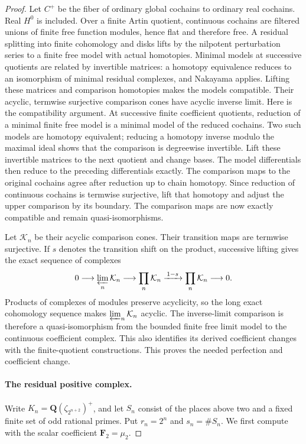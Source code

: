 \documentclass[11pt]{article}
\theoremstyle{definition}
\theoremstyle{remark}
\begin{document}
\begin{proof}\leavevmode
Let $C^+$ be the fiber of ordinary global cochains to ordinary real
cochains. Real $H^0$ is included. Over a finite Artin quotient,
continuous cochains are filtered unions of finite free function
modules, hence flat and therefore free. A residual splitting into
finite cohomology and disks lifts by the nilpotent perturbation
series to a finite free model with actual homotopies. Minimal models
at successive quotients are related by invertible matrices:
a homotopy equivalence reduces to an isomorphism of minimal residual
complexes, and Nakayama applies. Lifting these matrices and comparison
homotopies makes the models compatible. Their acyclic, termwise
surjective comparison cones have acyclic inverse limit.
Here is the compatibility argument. At successive finite coefficient
quotients, reduction of a minimal finite free model is a minimal model
of the reduced cochains. Two such models are homotopy equivalent;
reducing a homotopy inverse modulo the maximal ideal shows that the
comparison is degreewise invertible. Lift these invertible matrices
to the next quotient and change bases. The model differentials then
reduce to the preceding differentials exactly. The comparison maps
to the original cochains agree after reduction up to chain homotopy.
Since reduction of continuous cochains is termwise surjective, lift
that homotopy and adjust the upper comparison by its boundary. The
comparison maps are now exactly compatible and remain
quasi-isomorphisms.

Let $\mathcal K_n$ be their acyclic comparison cones. Their transition
maps are termwise surjective. If $s$ denotes the transition shift on
the product, successive lifting gives the exact sequence of complexes
\[
 0\longrightarrow\varprojlim_n\mathcal K_n
 \longrightarrow\prod_n\mathcal K_n
 \xrightarrow{\,1-s\,}\prod_n\mathcal K_n
 \longrightarrow0.
\]
Products of complexes of modules preserve acyclicity, so the long
exact cohomology sequence makes $\varprojlim_n\mathcal K_n$ acyclic.
The inverse-limit comparison is therefore a quasi-isomorphism from
the bounded finite free limit model to the continuous coefficient
complex. This also identifies its derived coefficient changes with
the finite-quotient constructions.
This proves the needed perfection and coefficient change.

\paragraph{The residual positive complex.}
Write $K_n=\mathbf Q(\zeta_{2^{n+2}})^+$, and let $S_n$ consist of
the places above two and a fixed finite set of odd rational primes.
Put $r_n=2^n$ and $s_n=\#S_n$. We first compute with the scalar
coefficient $\mathbf F_2=\mu_2$.


\end{proof}
\end{document}
